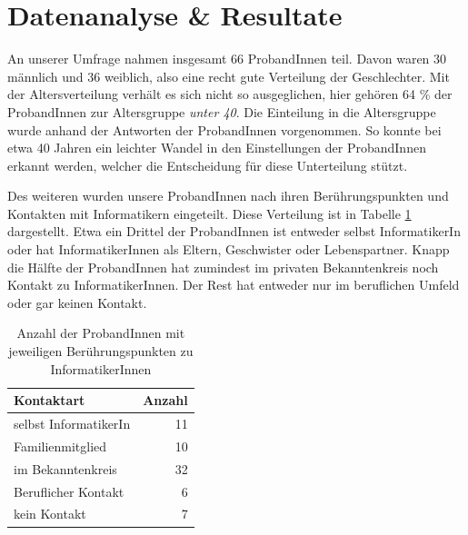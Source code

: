 \documentclass[de]{agse-empir-report}\usepackage[]{graphicx}\usepackage[]{color}
\newenvironment{knitrout}{}{} %
\begin{document}
\section[sl]{Datenanalyse \& Resultate} 




An unserer Umfrage nahmen insgesamt 66 ProbandInnen teil. Davon waren 30 m\"annlich und 36 weiblich, also eine recht gute Verteilung der Geschlechter. Mit der Altersverteilung verh\"alt es sich nicht so ausgeglichen, hier gehören 64 \% der ProbandInnen zur Altersgruppe \emph{unter 40}. Die Einteilung in die Altersgruppe wurde anhand der Antworten der ProbandInnen vorgenommen. So konnte bei etwa 40 Jahren ein leichter Wandel in den Einstellungen der ProbandInnen erkannt werden, welcher die Entscheidung f\"ur diese Unterteilung st\"utzt.

Des weiteren wurden unsere ProbandInnen nach ihren Ber\"uhrungspunkten und Kontakten mit Informatikern eingeteilt. Diese Verteilung ist in Tabelle \ref{tab:contact} dargestellt. Etwa ein Drittel der ProbandInnen ist entweder selbst InformatikerIn oder hat InformatikerInnen als Eltern, Geschwister oder Lebenspartner. Knapp die H\"alfte der ProbandInnen hat zumindest im privaten Bekanntenkreis noch Kontakt zu InformatikerInnen. Der Rest hat entweder nur im beruflichen Umfeld oder gar keinen Kontakt.

\begin{table}
   \centering
\begin{knitrout}
\color{fgcolor}
\begin{tabular}{lr}
\toprule
Kontaktart & Anzahl\\
\midrule
selbst InformatikerIn & 11\\
Familienmitglied & 10\\
im Bekanntenkreis & 32\\
Beruflicher Kontakt & 6\\
kein Kontakt & 7\\
\bottomrule
\end{tabular}


\end{knitrout}
   \caption{Anzahl der ProbandInnen mit jeweiligen Ber\"uhrungspunkten zu InformatikerInnen}
   \label{tab:contact}
\end{table}

\end{document}
